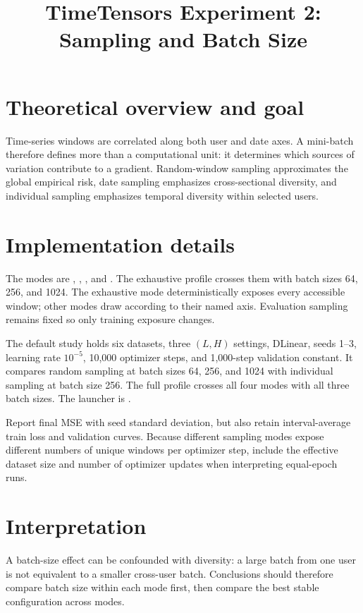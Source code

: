 \documentclass[10pt]{article}
\title{TimeTensors Experiment 2: Sampling and Batch Size}
\author{}
\date{}
\begin{document}
\maketitle
\section{Theoretical overview and goal}
Time-series windows are correlated along both user and date axes.  A mini-batch
therefore defines more than a computational unit: it determines which sources
of variation contribute to a gradient.  Random-window sampling approximates
the global empirical risk, date sampling emphasizes cross-sectional diversity,
and individual sampling emphasizes temporal diversity within selected users.


\section{Implementation details}
The modes are , , , and
. The exhaustive profile crosses them with batch sizes 64, 256, and 1024. The
exhaustive mode deterministically exposes every accessible window; other modes
draw according to their named axis.  Evaluation sampling remains fixed so only
training exposure changes.

The default study holds six datasets, three $(L,H)$ settings, DLinear, seeds
1--3, learning rate $10^{-5}$, 10,000 optimizer steps, and 1,000-step
validation constant. It compares random sampling at batch sizes 64, 256, and
1024 with individual sampling at batch size 256. The full profile crosses all
four modes with all three batch sizes. The launcher is
.

Report final MSE with seed standard deviation, but also retain interval-average
train loss and validation curves.  Because different sampling modes expose
different numbers of unique windows per optimizer step, include the effective
dataset size and number of optimizer updates when interpreting equal-epoch
runs.

\section{Interpretation}
A batch-size effect can be confounded with diversity: a large batch from one
user is not equivalent to a smaller cross-user batch.  Conclusions should
therefore compare batch size within each mode first, then compare the best
stable configuration across modes.
\end{document}
